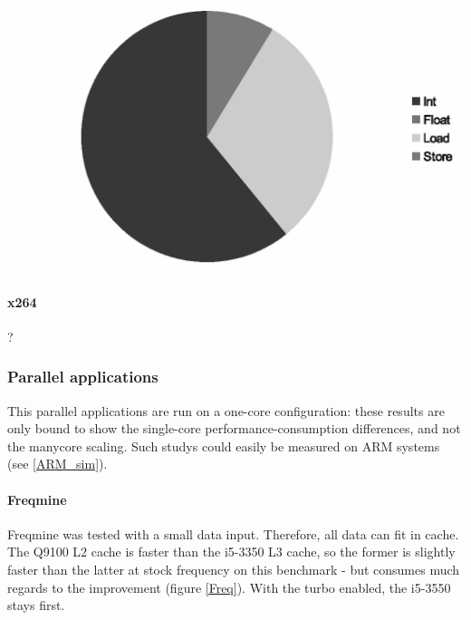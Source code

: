 \documentclass{article}
\newenvironment{Figure}
  {\par\medskip\noindent\center\minipage{0.9\linewidth}}
  {\endminipage\par\bigskip\medskip}
\begin{document}
\begin{multicols}{2}
\begin{Figure}
\centering
\includegraphics[width=\linewidth]{IS_instr.eps}
\end{Figure}


\paragraph{x264\\}
?


\subsubsection{Parallel applications}
This parallel applications are run on a one-core configuration: these results are only bound to show the single-core performance-consumption differences, and not the manycore scaling. Such studys could easily be measured on ARM systems (see \ref{ARM_sim}).

\paragraph{Freqmine\\}
Freqmine was tested with a small data input. Therefore, all data can fit in cache. The Q9100 L2 cache is faster than the i5-3350 L3 cache, so the former is slightly faster than the latter at stock frequency on this benchmark - but consumes much regards to the improvement (figure \ref{Freq}). With the turbo enabled, the i5-3550 stays first.


\end{multicols}
\end{document}
